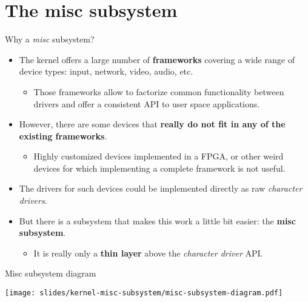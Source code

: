 \section{The misc subsystem}

\begin{frame}{Why a {\em misc} subsystem?}
  \begin{itemize}
  \item The kernel offers a large number of {\bf frameworks} covering
    a wide range of device types: input, network, video, audio,
    etc.
    \begin{itemize}
    \item Those frameworks allow to factorize common functionality
      between drivers and offer a consistent API to user space
      applications.
    \end{itemize}
  \item However, there are some devices that {\bf really do not fit in any
    of the existing frameworks}.
    \begin{itemize}
    \item Highly customized devices implemented in a FPGA, or other
      weird devices for which implementing a complete framework is not
      useful.
    \end{itemize}
  \item The drivers for such devices could be implemented directly as
    raw {\em character drivers}.
  \item But there is a subsystem that makes this work a little bit
    easier: the {\bf misc subsystem}.
    \begin{itemize}
    \item It is really only a {\bf thin layer} above the {\em character
        driver} API.
    \end{itemize}
  \end{itemize}
\end{frame}

\begin{frame}{Misc subsystem diagram}
  \begin{center}
    \texttt{[image: slides/kernel-misc-subsystem/misc-subsystem-diagram.pdf]}
  \end{center}
\end{frame}

